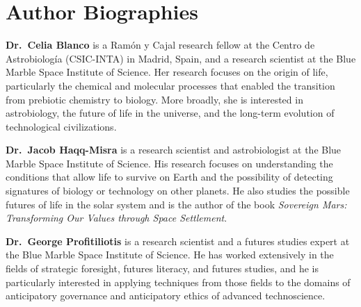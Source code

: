 \documentclass[11pt]{article}
\begin{document}
\section*{Author Biographies}

\textbf{Dr.\ Celia Blanco} is a Ram\'{o}n y Cajal research fellow at the Centro de Astrobiolog\'{i}a (CSIC-INTA) in Madrid, Spain, and a research scientist at the Blue Marble Space Institute of Science. Her research focuses on the origin of life, particularly the chemical and molecular processes that enabled the transition from prebiotic chemistry to biology. More broadly, she is interested in astrobiology, the future of life in the universe, and the long-term evolution of technological civilizations.

\vspace{1em}

\textbf{Dr.\ Jacob Haqq-Misra} is a research scientist and astrobiologist at the Blue Marble Space Institute of Science. His research focuses on understanding the conditions that allow life to survive on Earth and the possibility of detecting signatures of biology or technology on other planets. He also studies the possible futures of life in the solar system and is the author of the book \textit{Sovereign Mars: Transforming Our Values through Space Settlement}.

\vspace{1em}

\textbf{Dr.\ George Profitiliotis} is a research scientist and a futures studies expert at the Blue Marble Space Institute of Science. He has worked extensively in the fields of strategic foresight, futures literacy, and futures studies, and he is particularly interested in applying techniques from those fields to the domains of anticipatory governance and anticipatory ethics of advanced technoscience.
\end{document}
